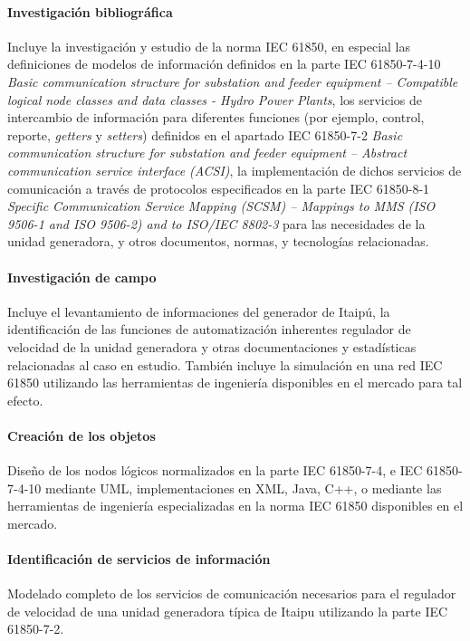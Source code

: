 \documentclass[conference,twocolumn]{IEEEtran}
\begin{document}
	\paragraph{Investigaci\'on bibliogr\'afica} 
		Incluye la investigaci\'on y estudio de la norma IEC 61850, en especial las definiciones de modelos de informaci\'on definidos en la parte IEC 61850-7-4-10 \emph{Basic communication structure for substation and feeder equipment – Compatible logical node classes and data classes - Hydro Power Plants}, los servicios de intercambio de informaci\'on para diferentes funciones (por ejemplo, control, reporte, \emph{getters} y \emph{setters}) definidos en el apartado IEC 61850-7-2 \emph{Basic communication structure for substation and feeder equipment – Abstract communication service interface (ACSI)}, la implementaci\'on de dichos servicios de comunicaci\'on a trav\'es de protocolos especificados en la parte IEC 61850-8-1 \emph{Specific Communication Service Mapping (SCSM) – Mappings to MMS (ISO 9506-1 and ISO 9506-2) and to ISO/IEC 8802-3} para las necesidades de la unidad generadora, y otros documentos, normas, y tecnolog\'ias relacionadas.
	\paragraph{Investigaci\'on de campo}
		Incluye el levantamiento de informaciones del generador de Itaip\'u, la identificaci\'on de las funciones de automatizaci\'on inherentes regulador de velocidad de la unidad generadora y otras documentaciones y estad\'isticas relacionadas al caso en estudio. Tambi\'en incluye la simulaci\'on en una red IEC 61850 utilizando las herramientas de ingenier\'ia disponibles en el mercado para tal efecto.
	\paragraph{Creaci\'on de los objetos}
		Dise\~no de los nodos l\'ogicos normalizados en la parte IEC 61850-7-4, e IEC 61850-7-4-10 mediante UML, implementaciones en XML, Java, C++, o mediante las herramientas de ingenier\'ia especializadas en la norma IEC 61850 disponibles en el mercado.
	\paragraph{Identificaci\'on de servicios de informaci\'on}
		Modelado completo de los servicios de comunicaci\'on necesarios para el regulador de velocidad de una unidad generadora t\'ipica de Itaipu utilizando la parte IEC 61850-7-2.
\end{document}
